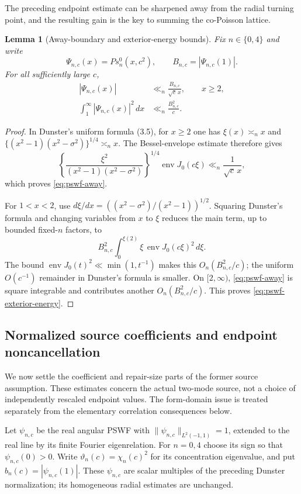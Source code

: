 \documentclass[11pt]{article}
\newtheorem{lemma}[theorem]{Lemma}
\theoremstyle{remark}
\begin{document}
The preceding endpoint estimate can be sharpened away from the radial turning point, and the resulting gain is the key to summing the co-Poisson lattice.

\begin{lemma}[Away-boundary and exterior-energy bounds]\label{lem:pswf-away-energy}
Fix $n\in\{0,4\}$ and write
\[
 \Psi_{n,c}(x)=Ps_n^0(x,c^2),\qquad B_{n,c}=|\Psi_{n,c}(1)|.
\]
For all sufficiently large $c$,
\begin{align}
 |\Psi_{n,c}(x)|&\ll_n \frac{B_{n,c}}{\sqrt c\,x},\qquad x\ge2,\label{eq:pswf-away}\\
 \int_1^\infty |\Psi_{n,c}(x)|^2\,dx&\ll_n \frac{B_{n,c}^2}{c}.\label{eq:pswf-exterior-energy}
\end{align}
\end{lemma}
\begin{proof}
In Dunster's uniform formula (3.5), for $x\ge2$ one has $\xi(x)\asymp_n x$ and
$\{(x^2-1)(x^2-\sigma^2)\}^{1/4}\asymp_n x$.  The Bessel-envelope estimate therefore gives
\[
 \left\{\frac{\xi^2}{(x^2-1)(x^2-\sigma^2)}\right\}^{1/4}
 \operatorname{env}J_0(c\xi)
 \ll_n \frac1{\sqrt c\,x},
\]
which proves \eqref{eq:pswf-away}.

For $1<x<2$, use $d\xi/dx=((x^2-\sigma^2)/(x^2-1))^{1/2}$.  Squaring Dunster's formula and changing variables from $x$ to $\xi$ reduces the main term, up to bounded fixed-$n$ factors, to
\[
 B_{n,c}^2\int_0^{\xi(2)}
 \xi\,\operatorname{env}J_0(c\xi)^2\,d\xi.
\]
The bound $\operatorname{env}J_0(t)^2\ll\min(1,t^{-1})$ makes this $O_n(B_{n,c}^2/c)$; the uniform $O(c^{-1})$ remainder in Dunster's formula is smaller.  On $[2,\infty)$, \eqref{eq:pswf-away} is square integrable and contributes another $O_n(B_{n,c}^2/c)$.  This proves \eqref{eq:pswf-exterior-energy}.
\end{proof}

\subsection*{Normalized source coefficients and endpoint noncancellation}
We now settle the coefficient and repair-size parts of the former source
assumption. These estimates concern the actual two-mode source, not a
choice of independently rescaled endpoint values. The form-domain issue
is treated separately from the elementary correlation consequences below.

Let $\psi_{n,c}$ be the real angular PSWF with
$\|\psi_{n,c}\|_{L^2(-1,1)}=1$, extended to the real line by its finite
Fourier eigenrelation. For $n=0,4$ choose its sign so that
$\psi_{n,c}(0)>0$. Write $\vartheta_n(c)=\chi_n(c)^2$ for its
concentration eigenvalue, and put $b_n(c)=|\psi_{n,c}(1)|$.
These $\psi_{n,c}$ are scalar multiples of the preceding Dunster
normalization; its homogeneous radial estimates are unchanged.
\end{document}
